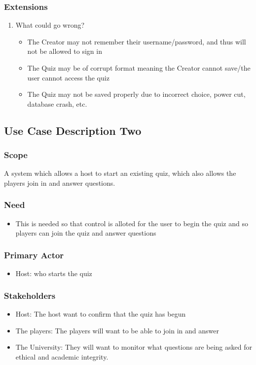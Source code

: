 \documentclass[a4paper]{article}
\begin{document}
	\subsubsection{Extensions}
	\begin{enumerate}
		\item What could go wrong?
		\begin{itemize}
			\item The Creator may not remember their username/password, and thus will not be allowed to sign in
			\item The Quiz may be of corrupt format meaning the Creator cannot save/the user cannot access the quiz
			\item The Quiz may not be saved properly due to incorrect choice, power cut, database crash, etc.
		\end{itemize}
	\end{enumerate}
	
	 \subsection{Use Case Description Two}
	\subsubsection{Scope}
	A system which allows a host to start an existing quiz, which also
	allows the players join in and answer questions.
	\subsubsection{Need}
	\begin{itemize}
		\item This is needed so that control is alloted for the user to begin the quiz and so
		players can join the quiz and answer questions
	\end{itemize}
	\subsubsection{Primary Actor}
	\begin{itemize}
		\item Host: who starts the quiz
	\end{itemize}
	\subsubsection{Stakeholders}
	\begin{itemize}
		\item  Host: The host want to confirm that the quiz has begun
		\item  The players: The players will want to be able to join in and answer
		\item  The University: They will want to monitor what questions are being asked for ethical and academic
		integrity.
	\end{itemize}
\end{document}
